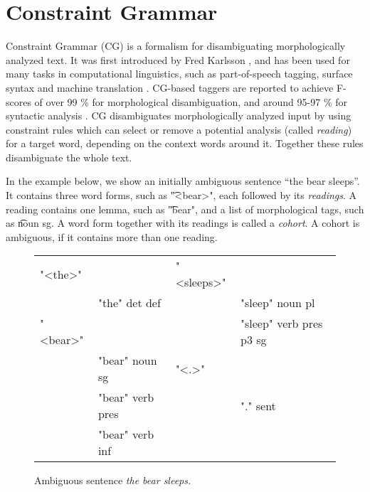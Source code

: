 \def\pmcfg{PMCFG}
\def\gf{GF}
\def\cg{CG}
\def\fsig{FSIG}
\newcommand{\quality}[1]{${\tt Quality_{#1}}$}
\newcommand{\kind}[1]{${\tt Kind_{#1}}$}
\newcommand{\very}[1]{${\tt Very_{#1}}$}
\newcommand{\comment}{${\tt Comment}$}
\newcommand{\modFun}[2]{${\tt Mod_{#1\times#2}}$}
\newcommand{\predFun}[3]{${\tt Pred_{#1\times#2\times#3}}$}
\newcommand{\itemSpa}[2]{${\tt Item_{#1\times#2}}$}
\newcommand{\itemEng}[1]{${\tt Item_{#1}}$}

\section{Constraint Grammar}
\label{sec:cg-intro}

Constraint Grammar (\cg{}) is a formalism for 
disambiguating morphologically analyzed text. 
It was first introduced by Fred Karlsson  
\cite{karlsson1990cgp,karlsson1995constraint}, and has been used for
many tasks in computational linguistics, such as part-of-speech
tagging, surface syntax and machine translation \cite{bick2011}.
\cg{}-based taggers are reported to achieve F-scores of over 99 \% for
morphological disambiguation, and around 95-97 \% for syntactic analysis
\cite{bick2000palavras,bick2003hybridCG_PSG,bick2006spanish}. 
\cg{} disambiguates morphologically analyzed input by using constraint
rules which can select or remove a potential analysis (called
\emph{reading}) for a target word, depending on the context words
around it.  Together these rules disambiguate the whole text.


In the example below, we show an initially ambiguous sentence ``the bear
sleeps''. 
It contains three word forms, such as \t{"<bear>"}, each followed by its \emph{readings}.
A reading contains one lemma, such as \t{"bear"}, and a list of morphological tags, such as \t{noun sg}.
A word form together with its readings is called a \emph{cohort}. A cohort is ambiguous, if it contains more than one reading.

\begin{figure}[h]
\centering
\ttfamily
\begin{tabular}{p{0.6cm} l  p{0.6cm} l}
"<the>"  &                & "<sleeps>"        \\
    & "the" det def       &     & "sleep" noun pl \\
"<bear>" &                &     & "sleep" verb pres p3 sg \\
    & "bear" noun sg      & "<.>"                   \\
    & "bear" verb pres    &     & "." sent          \\
    & "bear" verb inf \\
\end{tabular}
\label{fig:theBearSleeps}
\caption{Ambiguous sentence {\em the bear sleeps.}}
\end{figure}


